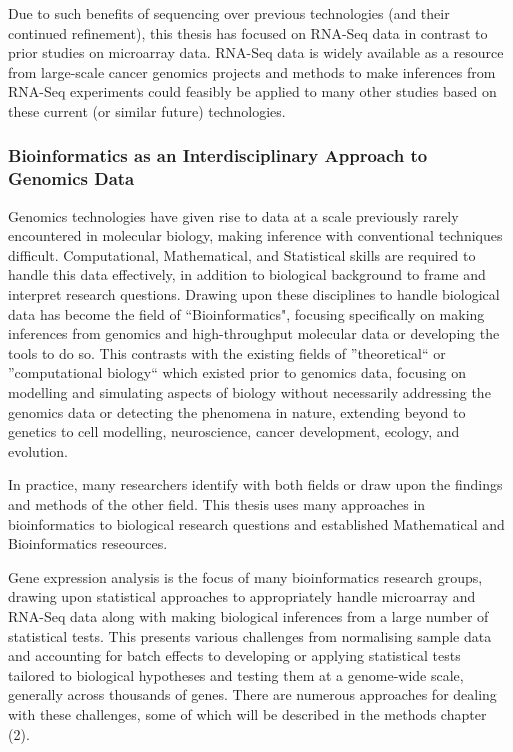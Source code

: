Due to such benefits of sequencing over previous technologies (and their continued refinement), this thesis has focused on RNA-Seq data in contrast to prior studies on microarray data. RNA-Seq data is widely available as a resource from large-scale cancer genomics projects and methods to make inferences from RNA-Seq experiments could feasibly be applied to many other studies based on these current (or similar future) technologies.


\subsubsection{Bioinformatics as an Interdisciplinary Approach to Genomics Data}
Genomics technologies have given rise to data at a scale previously rarely encountered in molecular biology, making inference with conventional techniques difficult. Computational, Mathematical, and Statistical skills are required to handle this data effectively, in addition to biological background to frame and interpret research questions. Drawing upon these disciplines to handle biological data has become the field of ``Bioinformatics", focusing specifically on making inferences from genomics and high-throughput molecular data or developing the tools to do so. This contrasts with the existing fields of ''theoretical`` or ''computational biology`` which existed prior to genomics data, focusing on modelling and simulating aspects of biology without necessarily addressing the genomics data or detecting the phenomena in nature, extending beyond to genetics to cell modelling, neuroscience, cancer development, ecology, and evolution.

In practice, many researchers identify with both fields or draw upon the findings and methods of the other field. This thesis uses many approaches in bioinformatics to biological research questions and established Mathematical and Bioinformatics reseources.

Gene expression analysis is the focus of many bioinformatics research groups, drawing upon statistical approaches to appropriately handle microarray and RNA-Seq data along with making biological inferences from a large number of statistical tests. This presents various challenges from normalising sample data and accounting for batch effects to developing or applying statistical tests tailored to biological hypotheses and testing them at a genome-wide scale, generally across thousands of genes. There are numerous approaches for dealing with these challenges, some of which will be described in the methods chapter (2).

